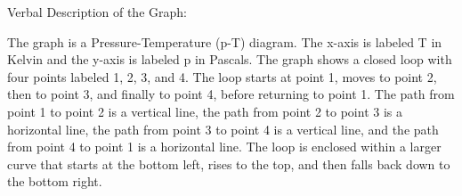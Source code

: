 Verbal Description of the Graph:

The graph is a Pressure-Temperature (p-T) diagram. The x-axis is labeled T in Kelvin and the y-axis is labeled p in Pascals. The graph shows a closed loop with four points labeled 1, 2, 3, and 4. The loop starts at point 1, moves to point 2, then to point 3, and finally to point 4, before returning to point 1. The path from point 1 to point 2 is a vertical line, the path from point 2 to point 3 is a horizontal line, the path from point 3 to point 4 is a vertical line, and the path from point 4 to point 1 is a horizontal line. The loop is enclosed within a larger curve that starts at the bottom left, rises to the top, and then falls back down to the bottom right.